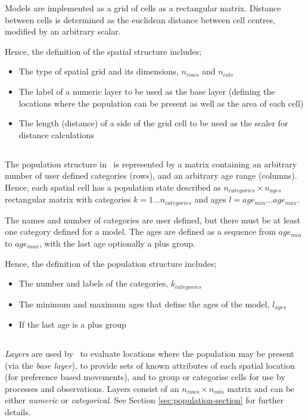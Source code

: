 Models are implemented as a grid of cells as a rectangular matrix. Distance between cells is determined as the euclidean distance between cell centres, modified by an arbitrary scalar. 

Hence, the definition of the spatial structure includes;
\begin{itemize}
\item The type of spatial grid and its dimensions, $n_{rows}$ and $n_{cols}$
\item The label of a numeric layer to be used as the base layer (defining the locations where the population can be present as well as the area of each cell)
\item The length (distance) of a side of the grid cell to be used as the scaler for distance calculations
\end{itemize}

\subsection{}

The population structure in \SPM\ is represented by a matrix containing an arbitrary number of user defined categories (rows), and an arbitrary age range (columns). Hence, each spatial cell has a population state described as $n_{categories} \times n_{ages}$ rectangular matrix with categories $k=1 \ldots n_{categories}$ and ages $l=age_{min} \ldots age_{max}$. 

The names and number of categories are user defined, but there must be at least one category defined for a model. The ages are defined as a sequence from $age_{min}$ to $age_{max}$, with the last age optionally a plus group.

Hence, the definition of the population structure includes;
\begin{itemize}
  \item The number and labels of the categories, $k_{categories}$
  \item The minimum and maximum ages that define the ages of the model, $l_{ages}$
  \item If the last age is a plus group
\end{itemize}

\subsection{\label{sec:layers}}

\emph{Layers} are used by \SPM\ to evaluate locations where the population may be present (via the \emph{base layer}), to provide sets of known attributes of each spatial location (for preference based movements), and to group or categorise cells for use by processes and observations. Layers consist of an $n_{rows} \times n_{cols}$ matrix and can be either \emph{numeric} or \emph{categorical}. See Section \ref{sec:population-section} for further details.

